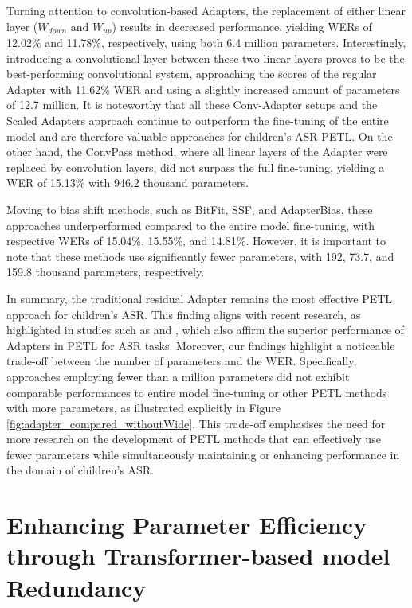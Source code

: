 Turning attention to convolution-based Adapters, the replacement of either linear layer ($W_{down}$ and $W_{up}$) results in decreased performance, yielding WERs of 12.02\% and 11.78\%, respectively, using both 6.4 million parameters. Interestingly, introducing a convolutional layer between these two linear layers proves to be the best-performing convolutional system, approaching the scores of the regular Adapter with 11.62\% \ac{WER} and using a slightly increased amount of parameters of 12.7 million. It is noteworthy that all these Conv-Adapter setups and the Scaled Adapters approach continue to outperform the fine-tuning of the entire model and are therefore valuable approaches for children's \ac{ASR} \ac{PETL}.
On the other hand, the ConvPass method, where all linear layers of the Adapter were replaced by convolution layers, did not surpass the full fine-tuning, yielding a \ac{WER} of 15.13\% with 946.2 thousand parameters.

Moving to bias shift methods, such as BitFit, \ac{SSF}, and AdapterBias, these approaches underperformed compared to the entire model fine-tuning, with respective \acp{WER} of 15.04\%, 15.55\%, and 14.81\%. However, it is important to note that these methods use significantly fewer parameters, with 192, 73.7, and 159.8 thousand parameters, respectively.

In summary, the traditional residual Adapter remains the most effective \ac{PETL} approach for children's \ac{ASR}. This finding aligns with recent research, as highlighted in studies such as \cite{li2023evaluating} and \cite{cappellazzo2023parameter}, which also affirm the superior performance of Adapters in \ac{PETL} for \ac{ASR} tasks. Moreover, our findings highlight a noticeable trade-off between the number of parameters and the \ac{WER}. Specifically, approaches employing fewer than a million parameters did not exhibit comparable performances to entire model fine-tuning or other \ac{PETL} methods with more parameters, as illustrated explicitly in Figure \ref{fig:adapter_compared_withoutWide}. This trade-off emphasises the need for more research on the development of \ac{PETL} methods that can effectively use fewer parameters while simultaneously maintaining or enhancing performance in the domain of children's \ac{ASR}.

\section{Enhancing Parameter Efficiency through Transformer-based model Redundancy}
